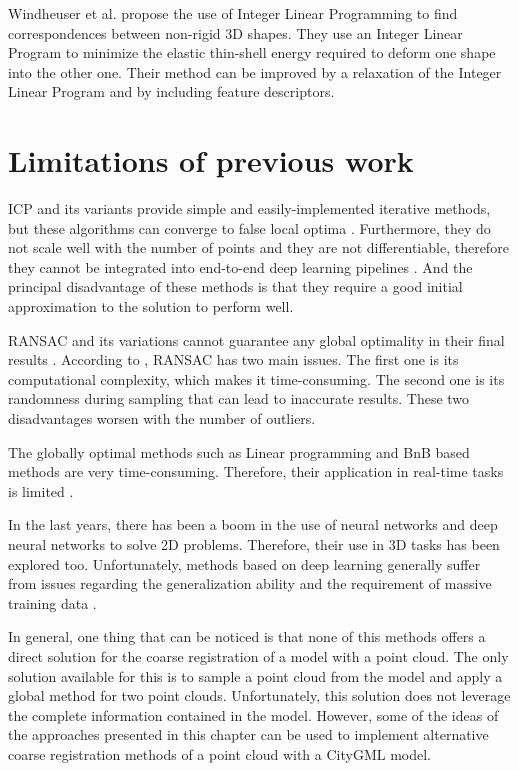     Windheuser et al. \cite{Windheuser_2011_largescale} propose the use of Integer Linear Programming to find correspondences between non-rigid 3D shapes.
    They use an Integer Linear Program to minimize the elastic thin-shell energy required to deform one shape into the other one.
    Their method can be improved by a relaxation of the Integer Linear Program and by including feature descriptors.

    \section{Limitations of previous work}
    ICP and its variants provide simple and easily-implemented iterative methods, but these algorithms can converge to false local optima \cite{Wang_2019_deepclosest}.
    Furthermore, they do not scale well with the number of points and they are not differentiable, therefore they cannot be integrated into end-to-end
    deep learning pipelines \cite{Sarode_2019_oneframework}. 
    And the principal disadvantage of these methods is that they require a good initial approximation to the solution to perform well.
    
    RANSAC and its variations cannot guarantee any global optimality in their final results \cite{Bazin_2013_abranchandbound}.
    According to \cite{Quan_2020_com}, RANSAC has two main issues. 
    The first one is its computational complexity, which makes it time-consuming.
    The second one is its randomness during sampling that can lead to inaccurate results.
    These two disadvantages worsen with the number of outliers.

    The globally optimal methods such as Linear programming and BnB based methods are very time-consuming. 
    Therefore, their application in real-time tasks is limited \cite{Sarode_2019_oneframework}.

    In the last years, there has been a boom in the use of neural networks and deep neural networks to solve 2D problems.
    Therefore, their use in 3D tasks has been explored too.
    Unfortunately, methods based on deep learning generally suffer from issues regarding the generalization ability and the requirement of massive training data \cite{Quan_2020_com}.

    In general, one thing that can be noticed is that none of this methods offers a direct solution for the coarse registration of a model with a point cloud.
    The only solution available for this is to sample a point cloud from the model and apply a global method for two point clouds.
    Unfortunately, this solution does not leverage the complete information contained in the model.
    However, some of the ideas of the approaches presented in this chapter can be used to implement alternative coarse registration methods of a point cloud with a CityGML model.


